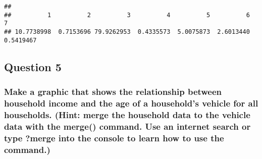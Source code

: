 \documentclass[
]{article}
\begin{document}
\begin{verbatim}
## 
##          1          2          3          4          5          6          7 
## 10.7738998  0.7153696 79.9262953  0.4335573  5.0075873  2.6013440  0.5419467
\end{verbatim}

\hypertarget{question-5}{%
\subsection{Question 5}\label{question-5}}

\hypertarget{make-a-graphic-that-shows-the-relationship-between-household-income-and-the-age-of-a-households-vehicle-for-all-households.-hint-merge-the-household-data-to-the-vehicle-data-with-the-merge-command.-use-an-internet-search-or-type-merge-into-the-console-to-learn-how-to-use-the-command.}{%
\subsubsection{Make a graphic that shows the relationship between
household income and the age of a household's vehicle for all
households. (Hint: merge the household data to the vehicle data with the
merge() command. Use an internet search or type ?merge into the console
to learn how to use the
command.)}\label{make-a-graphic-that-shows-the-relationship-between-household-income-and-the-age-of-a-households-vehicle-for-all-households.-hint-merge-the-household-data-to-the-vehicle-data-with-the-merge-command.-use-an-internet-search-or-type-merge-into-the-console-to-learn-how-to-use-the-command.}}
\end{document}
